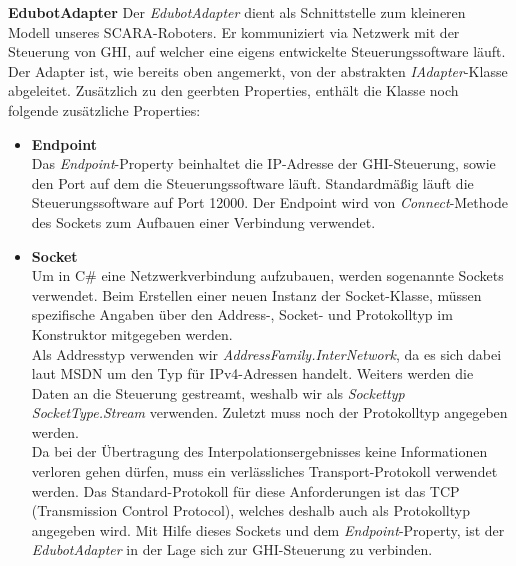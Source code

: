 \textbf{EdubotAdapter}
\newline
Der \textit{EdubotAdapter} dient als Schnittstelle zum kleineren Modell unseres SCARA-Roboters. Er kommuniziert via Netzwerk mit der Steuerung von GHI, auf welcher eine eigens entwickelte Steuerungssoftware läuft. Der Adapter ist, wie bereits oben angemerkt, von der abstrakten \textit{IAdapter}-Klasse abgeleitet. Zusätzlich zu den geerbten Properties, enthält die Klasse noch folgende zusätzliche Properties:
\begin{itemize}
\item \textbf{Endpoint}\\
Das \textit{Endpoint}-Property beinhaltet die IP-Adresse der GHI-Steuerung, sowie den Port auf dem die Steuerungssoftware läuft. Standardmäßig läuft die Steuerungssoftware auf Port 12000. Der Endpoint wird von \textit{Connect}-Methode des Sockets zum Aufbauen einer Verbindung verwendet.
\item \textbf{Socket}\\
Um in C\# eine Netzwerkverbindung aufzubauen, werden sogenannte Sockets verwendet. Beim Erstellen einer neuen Instanz der Socket-Klasse, müssen spezifische Angaben über den Address-, Socket- und Protokolltyp im Konstruktor mitgegeben werden.\\
Als Addresstyp verwenden wir \textit{AddressFamily.InterNetwork}, da es sich dabei laut MSDN um den Typ für IPv4-Adressen handelt. Weiters werden die Daten an die Steuerung gestreamt, weshalb wir als \textit{Sockettyp SocketType.Stream} verwenden. Zuletzt muss noch der Protokolltyp angegeben werden. \\
Da bei der Übertragung des Interpolationsergebnisses keine Informationen verloren gehen dürfen, muss ein verlässliches Transport-Protokoll verwendet werden. Das Standard-Protokoll für diese Anforderungen ist das TCP (Transmission Control Protocol), welches deshalb auch als Protokolltyp angegeben wird.
Mit Hilfe dieses Sockets und dem \textit{Endpoint}-Property, ist der \textit{EdubotAdapter} in der Lage sich zur GHI-Steuerung zu verbinden.
\end{itemize}


